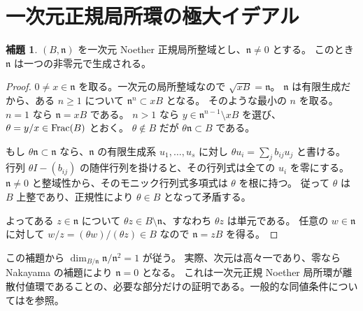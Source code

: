 \documentclass[11pt,a4paper]{ltjsarticle}
\numberwithin{equation}{section}
\theoremstyle{definition}
\newtheorem{lemma}[theorem]{補題}
\begin{document}
\section{一次元正規局所環の極大イデアル}\label{app:local}
\begin{lemma}\label{lem:principal-max}
$(B,\mathfrak n)$ を一次元 Noether 正規局所整域とし、$\mathfrak n\ne0$ とする。
このとき $\mathfrak n$ は一つの非零元で生成される。
\end{lemma}
\begin{proof}
$0\ne x\in\mathfrak n$ を取る。一次元の局所整域なので $\sqrt{xB}=\mathfrak n$。
$\mathfrak n$ は有限生成だから、ある $n\ge1$ について $\mathfrak n^n\subset xB$ となる。
そのような最小の $n$ を取る。
$n=1$ なら $\mathfrak n=xB$ である。
$n>1$ なら $y\in\mathfrak n^{n-1}\setminus xB$ を選び、$\theta=y/x\in\operatorname{Frac}(B)$ とおく。
$\theta\notin B$ だが $\theta\mathfrak n\subset B$ である。

もし $\theta\mathfrak n\subset\mathfrak n$ なら、$\mathfrak n$ の有限生成系 $u_1,\dots,u_s$ に対し
$\theta u_i=\sum_j b_{ij}u_j$ と書ける。
行列 $\theta I-(b_{ij})$ の随伴行列を掛けると、その行列式は全ての $u_i$ を零にする。
$\mathfrak n\ne0$ と整域性から、そのモニック行列式多項式は $\theta$ を根に持つ。
従って $\theta$ は $B$ 上整であり、正規性により $\theta\in B$ となって矛盾する。

よってある $z\in\mathfrak n$ について $\theta z\in B\setminus\mathfrak n$、すなわち $\theta z$ は単元である。
任意の $w\in\mathfrak n$ に対して
$w/z=(\theta w)/(\theta z)\in B$ なので $\mathfrak n=zB$ を得る。
\end{proof}
この補題から $\dim_{B/\mathfrak n}\mathfrak n/\mathfrak n^2=1$ が従う。
実際、次元は高々一であり、零なら Nakayama の補題により $\mathfrak n=0$ となる。
これは一次元正規 Noether 局所環が離散付値環であることの、必要な部分だけの証明である。一般的な同値条件については\cite{stacks-dvr}を参照。
\end{document}
